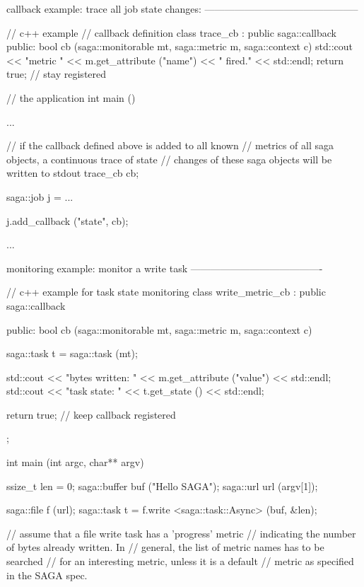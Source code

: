  \begin{mycode}
  callback example: trace all job state changes:
  -----------------------------------------------
 
    // c++ example
    // callback definition
    class trace_cb : public saga::callback
    {
      public:
        bool cb (saga::monitorable mt, 
                 saga::metric      m, 
                 saga::context     c)
        {
          std::cout << "metric " << m.get_attribute ("name")
                    << " fired." << std::endl;
          return true; // stay registered
        }
    }
 
    // the application
    int main ()
    {
      ...
 
      // if the callback defined above is added to all known
      // metrics of all saga objects, a continuous trace of state
      // changes of these saga objects will be written to stdout
      trace_cb cb;
 
      saga::job j = ...
 
      j.add_callback ("state", cb);
 
      ...
    }
 
 
  monitoring example: monitor a write task
  ----------------------------------------
 
    // c++ example for task state monitoring
    class write_metric_cb : public saga::callback
    {
      public:
        bool cb (saga::monitorable mt, 
                 saga::metric      m, 
                 saga::context     c)
        {
          saga::task t = saga::task (mt);
 
          std::cout << "bytes written: "
                    << m.get_attribute ("value")
                    << std::endl;
          std::cout << "task state:   "
                    << t.get_state ()
                    << std::endl;
 
          return true; // keep callback registered
        }
    };
 
    int main (int argc, char** argv)
    {
      ssize_t      len = 0;
      saga::buffer buf ("Hello SAGA\n");
      saga::url    url (argv[1]);
 
      saga::file   f (url);
      saga::task   t = f.write <saga::task::Async> (buf, &len);
 
      // assume that a file write task has a 'progress' metric
      // indicating the number of bytes already written.  In
      // general, the list of metric names has to be searched
      // for an interesting metric, unless it is a default
      // metric as specified in the SAGA spec.
 
}
\end{mycode}
